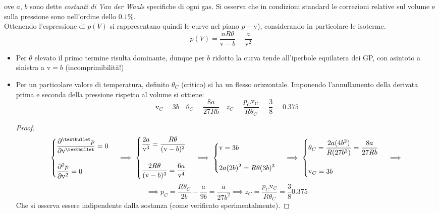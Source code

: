\documentclass[10pt, oneside]{book}
\newcommand{\molvol}{\mathrm{v}}
\begin{document}
ove $a$, $b$ sono dette \textit{costanti di Van der Waals} specifiche di ogni gas. Si osserva che in condizioni standard le correzioni relative sul volume e sulla pressione sono nell'ordine dello $0.1\%$. 
\\Ottenendo l'espressione di $p(V)$ si rappresentano quindi le curve nel piano $p-\molvol$), considerando in particolare le isoterme. 
\[p(V) = \frac{nR\theta}{\molvol - b} - \frac{a}{\molvol^2}\]
\begin{itemize}[label=$\square$]
\item Per $\theta$ elevato il primo termine risulta dominante, dunque per $b$ ridotto la curva tende all'iperbole equilatera dei GP, con asintoto a sinistra a $\molvol = b$ (incomprimibilità!)
\item Per un particolare valore di temperatura, definito $\theta_C$ (critico) si ha un flesso orizzontale. Imponendo l'annullamento della derivata prima e seconda della pressione rispetto al volume si ottiene:
\[\mathrm{v}_C = 3 b \quad \theta_C = \frac{8 a}{27 R b} \quad z_C = \frac{p_C \mathrm{v_C}}{R \theta_C} = \frac{3}{8} = 0.375\]
\begin{proof}
\[\begin{cases} \displaystyle \pdv[•]{p}{\molvol} = 0 \\ \\\displaystyle \pdv[2]{p}{\molvol} = 0
\end{cases} \implies \begin{cases} \displaystyle \frac{2a}{\molvol^3} = \frac{R \theta}{(\molvol - b)^2}\\ \\\displaystyle \frac{2 R \theta}{(\molvol - b)^3} = \frac{6a}{\molvol^4}
\end{cases} \implies \begin{cases} \displaystyle \molvol = 3b \\ \\ \displaystyle 2a(2b)^2 = R \theta (3b)^3
\end{cases} \implies \begin{cases} \displaystyle \theta_C = \frac{2a (4b^2)}{R (27b^3)} = \frac{8a}{27Rb} \\ \\ \displaystyle \molvol_C = 3b
\end{cases} \implies\]
\[\implies p_C = \frac{R \theta_C}{2b} - \frac{a}{9b} = \frac{a}{27b^2} \implies z_C = \frac{p_C \molvol_C}{R \theta_C} = \frac{3}{8} 0.375\]
Che si osserva essere indipendente dalla sostanza (come verificato sperimentalmente).

\end{proof}
\end{itemize}
\end{document}
